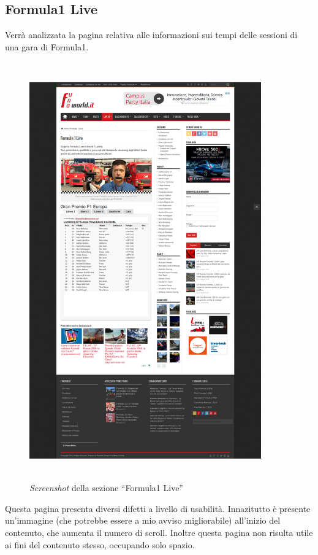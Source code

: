 \subsection{Formula1 Live}

Verrà analizzata la pagina relativa alle informazioni sui tempi delle sessioni
di una gara di Formula1.

\begin{figure}[H] %
  \centering
  \includegraphics[height=18cm, width=10cm]{res/img/Formula1Live_Full}
  \caption{\textit{Screenshot} della sezione ``Formula1 Live''}
\end{figure}

Questa pagina presenta diversi difetti a livello di usabilità.
Innazitutto è presente un'immagine (che potrebbe essere a mio avviso
migliorabile) all'inizio del contenuto, che aumenta il numero di scroll. Inoltre
questa pagina non risulta utile ai fini del contenuto stesso, occupando solo
spazio.

